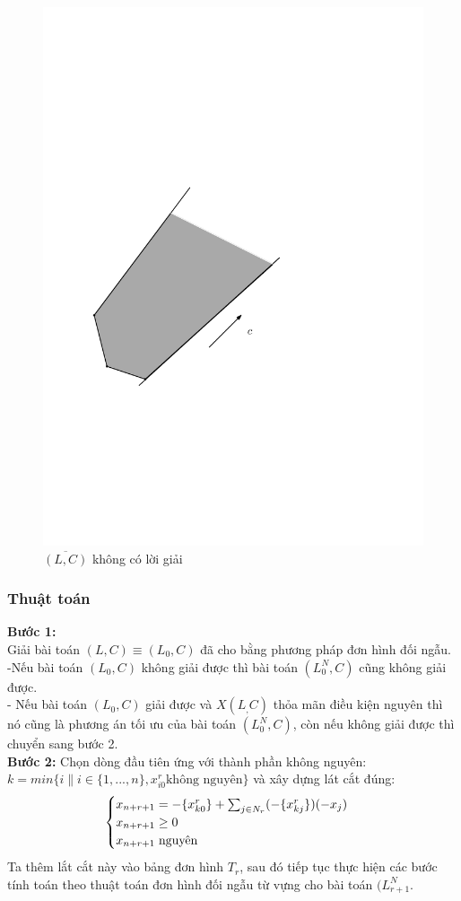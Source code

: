 \documentclass[12pt,a4paper]{report}
\begin{document}
\begin{figure}[h]
\centering
\includegraphics[width=0.4\linewidth]{anh3.pdf}
\caption{$\overline{(L,C)}$ không có lời giải}
\end{figure}
\subsubsection{ Thuật toán}

\textbf{Bước 1:}\\
Giải bài toán $(L,C)\equiv(L_0,C)$ đã cho bằng phương pháp đơn hình đối ngẫu.\\
-Nếu bài toán $(L_0,C)$ không giải được thì bài toán $(L^N_0,C)$ cũng không giải được.\\
- Nếu bài toán $(L_0,C)$ giải được và $X(L_,C)$ thỏa mãn điều kiện nguyên thì nó cũng là phương án tối ưu của bài toán $(L^N_0,C)$, còn nếu không giải được thì chuyển sang bước 2.\\

\textbf{Bước 2:}
Chọn dòng đầu tiên ứng với thành phần không nguyên:\\
$k=min\{i\|i\in \{1,...,n\},x_{i0}^r \text{không nguyên}\}$ và xây dựng lát cắt đúng:\\
$$   \begin{cases}\label{latcat}
    x_{n+r+1}= -\{x_{k0}^r\} + \sum_{j\in N_r}(-\{x_{kj}^r\} )(-x_j)\\
    x_{n+r+1} \ge 0\\
    x_{n+r+1} \hspace{0.1cm} \text{nguyên}
\end{cases}$$
Ta thêm lắt cắt này vào bảng đơn hình $T_r$, sau đó tiếp tục thực hiện các bước tính toán theo thuật toán đơn hình đối ngẫu từ vựng cho bài toán $(L^N_{r+1}$.\\
\end{document}
